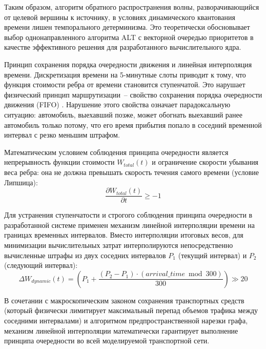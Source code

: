 Таким образом, алгоритм обратного распространения волны, разворачивающийся от целевой вершины к источнику, в условиях динамического квантования времени лишен темпорального детерминизма. Это теоретически обосновывает выбор однонаправленного алгоритма ALT с векторной очередью приоритетов в качестве эффективного решения для разработанного вычислительного ядра.

Принцип сохранения порядка очередности движения и линейная интерполяция времени.
Дискретизация времени на 5-минутные слоты приводит к тому, что функция стоимости ребра от времени становится ступенчатой. Это нарушает физический принцип маршрутизации~-- свойство сохранения порядка очередности движения (FIFO) \cite{goldberg2005external}. Нарушение этого свойства означает парадоксальную ситуацию: автомобиль, выехавший позже, может обогнать выехавший ранее автомобиль только потому, что его время прибытия попало в соседний временной интервал с резко меньшим штрафом.

Математическим условием соблюдения принципа очередности является непрерывность функции стоимости $W_{total}(t)$ и ограничение скорости убывания веса ребра: она не должна превышать скорость течения самого времени (условие Липшица): 
\begin{equation}
    \frac{\partial W_{total}(t)}{\partial t} \ge -1
\end{equation}

Для устранения ступенчатости и строгого соблюдения принципа очередности в разработанной системе применен механизм линейной интерполяции времени на границах временных интервалов. Вместо интерполяции итоговых весов, для минимизации вычислительных затрат интерполируются непосредственно вычисленные штрафы из двух соседних интервалов $P_1$ (текущий интервал) и $P_2$ (следующий интервал):
\begin{equation}
    \Delta W_{dynamic}(t) = \left( P_1 + \frac{(P_2 - P_1) \cdot (\mathit{arrival\_time} \bmod 300)}{300} \right) \gg 20
\end{equation}

В сочетании с макроскопическим законом сохранения транспортных средств (который физически лимитирует максимальный перепад объемов трафика между соседними интервалами) и алгоритмом предпространственной нарезки графа, механизм линейной интерполяции математически гарантирует выполнение принципа очередности во всей моделируемой транспортной сети.
